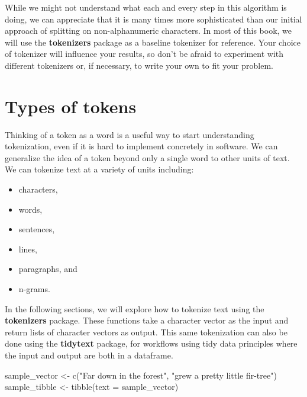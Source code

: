 \documentclass[
]{krantz}
\makeatletter
\newenvironment{Shaded}{\begin{snugshade}}{\end{snugshade}}
\newcommand{\AttributeTok}[1]{\textcolor[rgb]{0.77,0.63,0.00}{#1}}
\newcommand{\FunctionTok}[1]{\textcolor[rgb]{0.00,0.00,0.00}{#1}}
\newcommand{\NormalTok}[1]{#1}
\newcommand{\OtherTok}[1]{\textcolor[rgb]{0.56,0.35,0.01}{#1}}
\newcommand{\StringTok}[1]{\textcolor[rgb]{0.31,0.60,0.02}{#1}}
\newenvironment{kframe}{%
\medskip{}
\setlength{\fboxsep}{.8em}
 \def\at@end@of@kframe{}%
 \ifinner\ifhmode%
  \def\at@end@of@kframe{\end{minipage}}%
  \begin{minipage}{\columnwidth}%
 \fi\fi%
 \def\FrameCommand##1{\hskip\@totalleftmargin \hskip-\fboxsep
 \colorbox{shadecolor}{##1}\hskip-\fboxsep
     \hskip-\linewidth \hskip-\@totalleftmargin \hskip\columnwidth}%
 \MakeFramed {\advance\hsize-\width
   \@totalleftmargin\z@ \linewidth\hsize
   \@setminipage}}%
 {\par\unskip\endMakeFramed%
 \at@end@of@kframe}
\renewenvironment{Shaded}{\begin{kframe}}{\end{kframe}}
\makeatother
\begin{document}
While we might not understand what each and every step in this algorithm is doing, we can appreciate that it is many times more sophisticated than our initial approach of splitting on non-alphanumeric characters. In most of this book, we will use the \textbf{tokenizers} package as a baseline tokenizer for reference. Your choice of tokenizer will influence your results, so don't be afraid to experiment with different tokenizers or, if necessary, to write your own to fit your problem.

\hypertarget{types-of-tokens}{%
\section{Types of tokens}\label{types-of-tokens}}

Thinking of a token as a word is a useful way to start understanding tokenization, even if it is hard to implement concretely in software. We can generalize the idea of a token beyond only a single word to other units of text. We can tokenize text at a variety of units including:

\begin{itemize}
\item
  characters,
\item
  words,
\item
  sentences,
\item
  lines,
\item
  paragraphs, and
\item
  n-grams.
\end{itemize}

In the following sections, we will explore how to tokenize text using the \textbf{tokenizers} package. These functions take a character vector as the input and return lists of character vectors as output. This same tokenization can also be done using the \textbf{tidytext} \citep{Silge16} package, for workflows using tidy data principles where the input and output are both in a dataframe.

\begin{Shaded}
\begin{Highlighting}[]
\NormalTok{sample\_vector }\OtherTok{\textless{}{-}} \FunctionTok{c}\NormalTok{(}\StringTok{"Far down in the forest"}\NormalTok{,}
                   \StringTok{"grew a pretty little fir{-}tree"}\NormalTok{)}
\NormalTok{sample\_tibble }\OtherTok{\textless{}{-}} \FunctionTok{tibble}\NormalTok{(}\AttributeTok{text =}\NormalTok{ sample\_vector)}
\end{Highlighting}
\end{Shaded}
\end{document}
